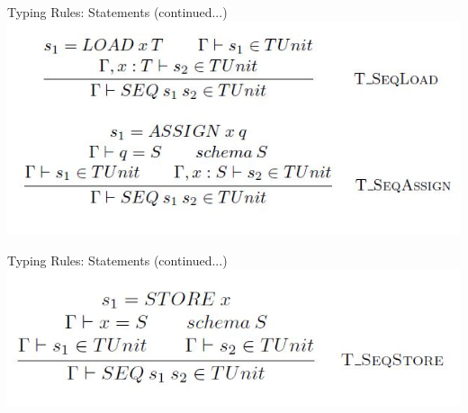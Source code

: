 \begin{frame}{Typing Rules: Statements (continued...)}
\centering
%          		
\includegraphics[scale=0.4]{Images/TypingRules/SEQ1.JPG}
\end{frame}

\begin{frame}{Typing Rules: Statements (continued...)}
\centering
\includegraphics[scale=0.4]{Images/TypingRules/SEQ2.JPG} 
\end{frame}

